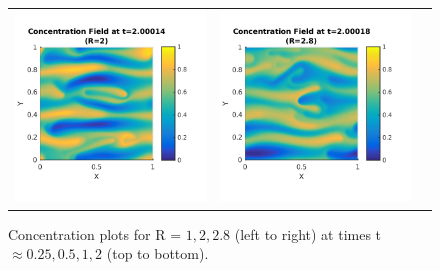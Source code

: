 \documentclass{article}
\begin{document}
\begin{enumerate}
\begin{figure}[!ht]
\begin{tabular}{c c c}
\includegraphics[scale=0.5]{conc20_200.png} &
\includegraphics[scale=0.5]{conc28_200.png}
\end{tabular}
\caption{Concentration plots for R = $1, 2, 2.8$ (left to right) at times t $\approx 0.25, 0.5, 1, 2$ (top to bottom).}
\label{fig:conc}
\end{figure}


\end{enumerate}
\end{document}
